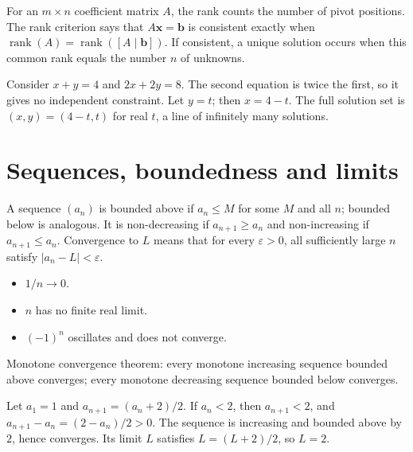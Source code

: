 \documentclass[12pt,a4paper]{article}
\begin{document}
For an $m\times n$ coefficient matrix $A$, the rank counts the number of pivot positions. The rank criterion says that $A\mathbf{x}=\mathbf{b}$ is consistent exactly when $\operatorname{rank}(A)=\operatorname{rank}([A\mid\mathbf{b}])$. If consistent, a unique solution occurs when this common rank equals the number $n$ of unknowns.

\begin{exampleBox}Consider $x+y=4$ and $2x+2y=8$. The second equation is twice the first, so it gives no independent constraint. Let $y=t$; then $x=4-t$. The full solution set is $(x,y)=(4-t,t)$ for real $t$, a line of infinitely many solutions.
\end{exampleBox}

\section{Sequences, boundedness and limits}
A sequence $(a_n)$ is bounded above if $a_n\le M$ for some $M$ and all $n$; bounded below is analogous. It is non-decreasing if $a_{n+1}\ge a_n$ and non-increasing if $a_{n+1}\le a_n$. Convergence to $L$ means that for every $\varepsilon>0$, all sufficiently large $n$ satisfy $|a_n-L|<\varepsilon$.
\begin{itemize}
\item $1/n\to0$.
\item $n$ has no finite real limit.
\item $(-1)^n$ oscillates and does not converge.
\end{itemize}
\begin{formulaBox}Monotone convergence theorem: every monotone increasing sequence bounded above converges; every monotone decreasing sequence bounded below converges.
\end{formulaBox}
\begin{exampleBox}Let $a_1=1$ and $a_{n+1}=(a_n+2)/2$. If $a_n<2$, then $a_{n+1}<2$, and $a_{n+1}-a_n=(2-a_n)/2>0$. The sequence is increasing and bounded above by $2$, hence converges. Its limit $L$ satisfies $L=(L+2)/2$, so $L=2$.
\end{exampleBox}
\begin{center}\end{center}
\end{document}
